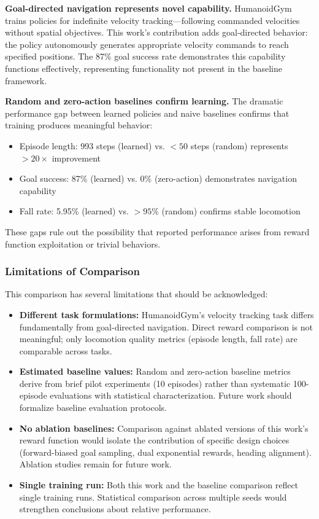 \documentclass[12pt,a4paper]{article}
\begin{document}
\textbf{Goal-directed navigation represents novel capability.} HumanoidGym trains policies for indefinite velocity tracking---following commanded velocities without spatial objectives. This work's contribution adds goal-directed behavior: the policy autonomously generates appropriate velocity commands to reach specified positions. The 87\% goal success rate demonstrates this capability functions effectively, representing functionality not present in the baseline framework.

\textbf{Random and zero-action baselines confirm learning.} The dramatic performance gap between learned policies and naive baselines confirms that training produces meaningful behavior:
\begin{itemize}
    \item Episode length: 993 steps (learned) vs. $<50$ steps (random) represents $>20\times$ improvement
    \item Goal success: 87\% (learned) vs. 0\% (zero-action) demonstrates navigation capability
    \item Fall rate: 5.95\% (learned) vs. $>95\%$ (random) confirms stable locomotion
\end{itemize}

These gaps rule out the possibility that reported performance arises from reward function exploitation or trivial behaviors.

\subsubsection{Limitations of Comparison}

This comparison has several limitations that should be acknowledged:

\begin{itemize}
    \item \textbf{Different task formulations:} HumanoidGym's velocity tracking task differs fundamentally from goal-directed navigation. Direct reward comparison is not meaningful; only locomotion quality metrics (episode length, fall rate) are comparable across tasks.

    \item \textbf{Estimated baseline values:} Random and zero-action baseline metrics derive from brief pilot experiments (10 episodes) rather than systematic 100-episode evaluations with statistical characterization. Future work should formalize baseline evaluation protocols.

    \item \textbf{No ablation baselines:} Comparison against ablated versions of this work's reward function would isolate the contribution of specific design choices (forward-biased goal sampling, dual exponential rewards, heading alignment). Ablation studies remain for future work.

    \item \textbf{Single training run:} Both this work and the baseline comparison reflect single training runs. Statistical comparison across multiple seeds would strengthen conclusions about relative performance.
\end{itemize}
\end{document}
